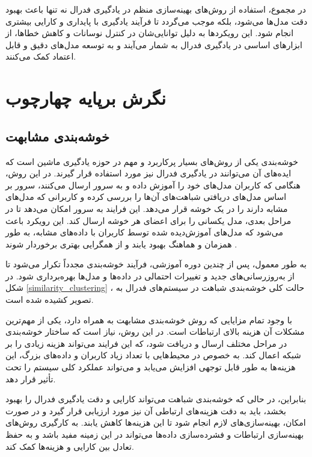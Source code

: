 در مجموع، استفاده از روش‌های بهینه‌سازی منظم در یادگیری فدرال نه تنها باعث بهبود دقت مدل‌ها می‌شود، بلکه موجب می‌گردد تا فرآیند یادگیری با پایداری و کارایی بیشتری انجام شود. این رویکردها به دلیل توانایی‌شان در کنترل نوسانات و کاهش خطاها، از ابزارهای اساسی در یادگیری فدرال به شمار می‌آیند و به توسعه مدل‌های دقیق و قابل اعتماد کمک می‌کنند.



\section{نگرش برپایه چهارچوب}
\subsection{
	خوشه‌بندی مشابهت%
}
خوشه‌بندی یکی از روش‌های بسیار پرکاربرد و مهم در حوزه یادگیری ماشین است که ایده‌های آن می‌توانند در یادگیری فدرال نیز مورد استفاده قرار گیرند. در این روش، هنگامی که کاربران مدل‌های خود را آموزش داده و به سرور ارسال می‌کنند، سرور بر اساس مدل‌های دریافتی شباهت‌های آن‌ها را بررسی کرده و کاربرانی که مدل‌های مشابه دارند را در یک خوشه قرار می‌دهد. این فرایند به سرور امکان می‌دهد تا در مراحل بعدی، مدل یکسانی را برای اعضای هر خوشه ارسال کند. این رویکرد باعث می‌شود که مدل‌های آموزش‌دیده شده توسط کاربران با داده‌های مشابه، به طور همزمان و هماهنگ بهبود یابند و از همگرایی بهتری برخوردار شوند
\cite{ghosh2019robust}.

به طور معمول، پس از چندین دوره آموزشی، فرآیند خوشه‌بندی مجدداً تکرار می‌شود تا از به‌روزرسانی‌های جدید و تغییرات احتمالی در داده‌ها و مدل‌ها بهره‌برداری شود. در شکل
\ref{similarity_clustering}%
، حالت کلی خوشه‌بندی شباهت در سیستم‌های فدرال به تصویر کشیده شده است.

با وجود تمام مزایایی که روش خوشه‌بندی مشابهت به همراه دارد، یکی از مهم‌ترین مشکلات آن هزینه بالای ارتباطات است. در این روش، نیاز است که ساختار خوشه‌بندی در مراحل مختلف ارسال و دریافت شود، که این فرایند می‌تواند هزینه زیادی را بر شبکه اعمال کند. به خصوص در محیط‌هایی با تعداد زیاد کاربران و داده‌های بزرگ، این هزینه‌ها به طور قابل توجهی افزایش می‌یابد و می‌تواند عملکرد کلی سیستم را تحت تأثیر قرار دهد.

بنابراین، در حالی که خوشه‌بندی شباهت می‌تواند کارایی و دقت یادگیری فدرال را بهبود بخشد، باید به دقت هزینه‌های ارتباطی آن نیز مورد ارزیابی قرار گیرد و در صورت امکان، بهینه‌سازی‌های لازم انجام شود تا این هزینه‌ها کاهش یابند. به کارگیری روش‌های بهینه‌سازی ارتباطات و فشرده‌سازی داده‌ها می‌تواند در این زمینه مفید باشد و به حفظ تعادل بین کارایی و هزینه‌ها کمک کند.

